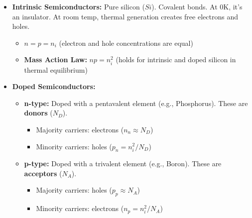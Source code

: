 \documentclass[12pt, letterpaper]{article}
\begin{document}
\begin{itemize}
    \item \textbf{Intrinsic Semiconductors:} Pure silicon ($Si$). Covalent bonds. At 0K, it's an insulator. At room temp, thermal generation creates free electrons and holes.
    \begin{itemize}
        \item $n = p = n_i$ (electron and hole concentrations are equal)
        \item \textbf{Mass Action Law:} $np = n_i^2$ (holds for intrinsic and doped silicon in thermal equilibrium)
    \end{itemize}
    
    \item \textbf{Doped Semiconductors:}
    \begin{itemize}
        \item \textbf{n-type:} Doped with a pentavalent element (e.g., Phosphorus). These are \textbf{donors} ($N_D$).
        \begin{itemize}
            \item Majority carriers: electrons ($n_n \approx N_D$)
            \item Minority carriers: holes ($p_n = n_i^2 / N_D$)
        \end{itemize}
        \item \textbf{p-type:} Doped with a trivalent element (e.g., Boron). These are \textbf{acceptors} ($N_A$).
        \begin{itemize}
            \item Majority carriers: holes ($p_p \approx N_A$)
            \item Minority carriers: electrons ($n_p = n_i^2 / N_A$)
        \end{itemize}
    \end{itemize}
    

\end{itemize}
\end{document}
